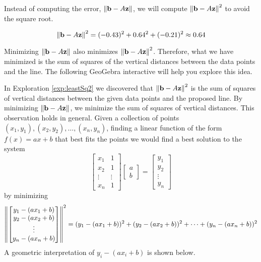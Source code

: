 \documentclass{ximera}
\begin{document}
\begin{exploration}
Instead of computing the error, $\left\lVert\mathbf{b}-A\mathbf{z}\right\rVert$, we will compute $\left\lVert\mathbf{b}-A\mathbf{z}\right\rVert^2$ to avoid the square root.

\begin{equation}
    \left\lVert\mathbf{b}-A\mathbf{z}\right\rVert^2=(-0.43)^2+0.64^2+(-0.21)^2\approx 0.64
\end{equation}

Minimizing $\left\lVert\mathbf{b}-A\mathbf{z}\right\rVert$ also minimizes $\left\lVert\mathbf{b}-A\mathbf{z}\right\rVert^2$.  Therefore, what we have minimized is the sum of squares of the vertical distances between the data points and the line.
The following GeoGebra interactive will help you explore this idea.


\begin{onlineOnly}
\begin{center}
\end{center}
\end{onlineOnly}
\end{exploration}


In Exploration \ref{exp:leastSq2} we discovered that $\left\lVert\mathbf{b}-A\mathbf{z}\right\rVert^2$ is the sum of squares of vertical distances between the given data points and the proposed line.  By minimizing $\left\lVert\mathbf{b}-A\mathbf{z}\right\rVert$, we minimize the sum of squares of vertical distances.  This observation holds in general.  Given a collection of points $(x_1, y_1), (x_2, y_2),\dots ,(x_n, y_n)$, finding a linear function of the form $f(x)=ax+b$ that best fits the points we would find a best solution to the system
$$\begin{bmatrix}x_1&1\\x_2&1\\\vdots&\vdots\\x_n&1\end{bmatrix}\begin{bmatrix}a\\b\end{bmatrix}=\begin{bmatrix}y_1\\y_2\\\vdots\\y_n\end{bmatrix}$$
by minimizing
$$\left\lVert\begin{bmatrix}y_1-(ax_1+b)\\y_2-(ax_2+b)\\\vdots\\y_n-(ax_n+b)\end{bmatrix}\right\rVert^2=(y_1-(ax_1+b))^2+(y_2-(ax_2+b))^2+\dots +(y_n-(ax_n+b))^2$$
A geometric interpretation of $y_i-(ax_i+b)$ is shown below.
\end{document}

